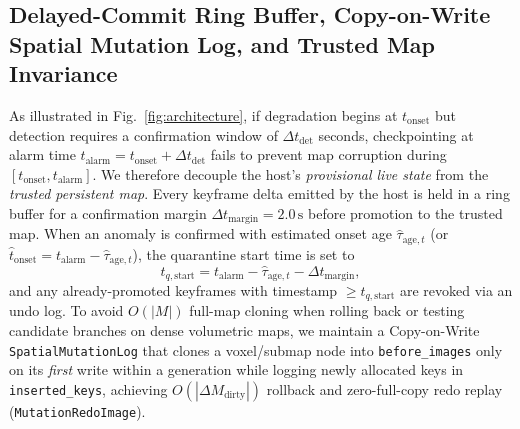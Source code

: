 \documentclass[journal]{IEEEtran}
\begin{document}
\subsection{Delayed-Commit Ring Buffer, Copy-on-Write Spatial Mutation Log, and Trusted Map Invariance}
As illustrated in Fig.~\ref{fig:architecture}, if degradation begins at $t_{\mathrm{onset}}$ but detection requires a confirmation window of $\Delta t_{\mathrm{det}}$ seconds, checkpointing at alarm time $t_{\mathrm{alarm}} = t_{\mathrm{onset}} + \Delta t_{\mathrm{det}}$ fails to prevent map corruption during $[t_{\mathrm{onset}}, t_{\mathrm{alarm}}]$. We therefore decouple the host's \emph{provisional live state} from the \emph{trusted persistent map}. Every keyframe delta emitted by the host is held in a ring buffer for a confirmation margin $\Delta t_{\mathrm{margin}} = 2.0\,\mathrm{s}$ before promotion to the trusted map. When an anomaly is confirmed with estimated onset age $\hat{\tau}_{\mathrm{age},t}$ (or $\hat{t}_{\mathrm{onset}} = t_{\mathrm{alarm}} - \hat{\tau}_{\mathrm{age},t}$), the quarantine start time is set to
\begin{equation}
    t_{q,\mathrm{start}} = t_{\mathrm{alarm}} - \hat{\tau}_{\mathrm{age},t} - \Delta t_{\mathrm{margin}},
\end{equation}
and any already-promoted keyframes with timestamp $\ge t_{q,\mathrm{start}}$ are revoked via an undo log. To avoid $O(|M|)$ full-map cloning when rolling back or testing candidate branches on dense volumetric maps, we maintain a Copy-on-Write \texttt{SpatialMutationLog} that clones a voxel/submap node into \texttt{before\_images} only on its \emph{first} write within a generation while logging newly allocated keys in \texttt{inserted\_keys}, achieving $O(|\Delta M_{\mathrm{dirty}}|)$ rollback and zero-full-copy redo replay (\texttt{MutationRedoImage}).

\begin{table}[!t]
\centering
\caption{Zero-Training Interpretable Mechanism Signature Matrix for Multi-Label Diagnosis and Repair Routing}
\label{tab:signature_matrix}
\renewcommand{\arraystretch}{1.15}
\end{table}
\end{document}
